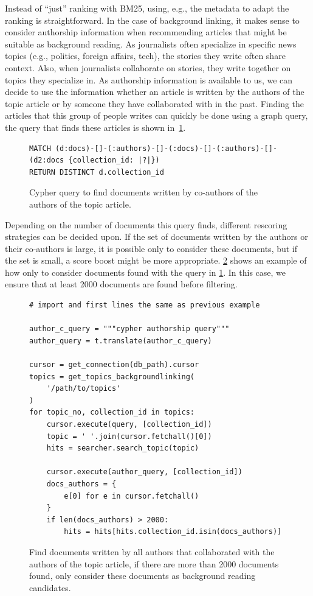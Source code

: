 \noindent Instead of ``just'' ranking with BM25, using, e.g., the metadata to adapt the ranking is straightforward. In the case of background linking, it makes sense to consider authorship information when recommending articles that might be suitable as background reading. As journalists often specialize in specific news topics (e.g., politics, foreign affairs, tech), the stories they write often share context. Also, when journalists collaborate on stories, they write together on topics they specialize in. As authorship information is available to us, we can decide to use the information whether an article is written by the authors of the topic article or by someone they have collaborated with in the past. Finding the articles that this group of people writes can quickly be done using a graph query, the query that finds these articles is shown in~\cref{fig:author-cypher}.

\begin{figure}
	\begin{verbatim}
MATCH (d:docs)-[]-(:authors)-[]-(:docs)-[]-(:authors)-[]-(d2:docs {collection_id: |?|}) 
RETURN DISTINCT d.collection_id
	\end{verbatim}
	\caption{Cypher query to find documents written by co-authors of the authors of the topic article.}
	\label{fig:author-cypher}
\end{figure}

\noindent Depending on the number of documents this query finds, different rescoring strategies can be decided upon. If the set of documents written by the authors or their co-authors is large, it is possible only to consider these documents, but if the set is small, a score boost might be more appropriate. \cref{fig:authors-code} shows an example of how only to consider documents found with the query in \cref{fig:author-cypher}. In this case, we ensure that at least 2000 documents are found before filtering.

\begin{figure}
	\begin{verbatim}
# import and first lines the same as previous example

author_c_query = """cypher authorship query"""
author_query = t.translate(author_c_query)

cursor = get_connection(db_path).cursor
topics = get_topics_backgroundlinking(
	'/path/to/topics'
)
for topic_no, collection_id in topics:
    cursor.execute(query, [collection_id])
    topic = ' '.join(cursor.fetchall()[0])
    hits = searcher.search_topic(topic)

    cursor.execute(author_query, [collection_id])
    docs_authors = {
        e[0] for e in cursor.fetchall()
    }
    if len(docs_authors) > 2000:
        hits = hits[hits.collection_id.isin(docs_authors)]
	\end{verbatim}
	\caption{Find documents written by all authors that collaborated with the authors of the topic article, if there are more than 2000 documents found, only consider these documents as background reading candidates.}
	\label{fig:authors-code}
\end{figure}

